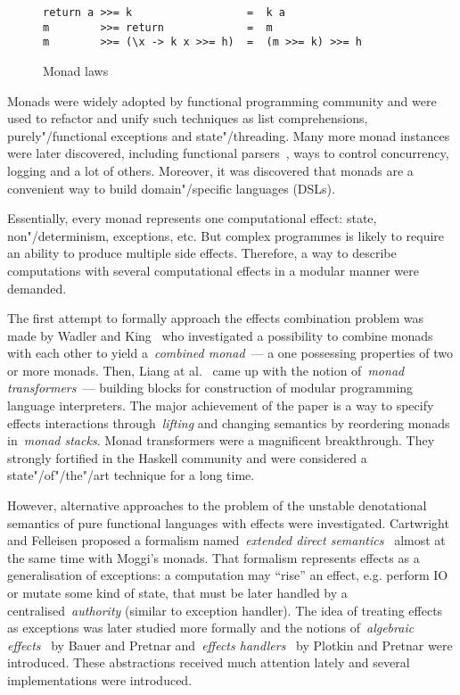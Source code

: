     \begin{figure}[h]
    \begin{lstlisting}
return a >>= k                  =  k a
m        >>= return             =  m
m        >>= (\x -> k x >>= h)  =  (m >>= k) >>= h
    \end{lstlisting}
    \caption{Monad laws}
    \label{listing:monadLaws}
    \end{figure}

Monads were widely adopted by functional programming community and were used to
refactor and unify such techniques as list comprehensions, purely"/functional
exceptions and state"/threading. Many more monad instances were later discovered,
including functional parsers~\cite{monParsing}, ways to control concurrency,
logging and a lot of others. Moreover, it was discovered that monads are a convenient
way to build domain"/specific languages (DSLs).

Essentially, every monad represents one computational effect: state,
non"/determinism, exceptions, etc. But complex programmes is likely to require an
ability to produce multiple side effects. Therefore, a way to describe
computations with several computational effects in a modular manner were demanded.

The first attempt to formally approach the effects combination problem was made
by Wadler and King~\cite{DBLP:conf/fp/KingW92} who investigated a possibility to
combine monads with each other to yield a~\emph{combined monad}~--- a one possessing
properties of two or more monads. Then, Liang at al.~\cite{Liang:1995:MTM:199448.199528}
came up with the notion of~\emph{monad transformers}~--- building blocks for construction
of modular programming language interpreters. The major achievement of the paper
is a way to specify effects interactions through~\emph{lifting} and changing
semantics by reordering monads in~\emph{monad stacks}. Monad transformers were a
magnificent breakthrough. They strongly fortified in the Haskell community and were
considered a state"/of"/the"/art technique for a long time.

However, alternative approaches to the problem of the unstable denotational semantics
of pure functional languages with effects were investigated. Cartwright and Felleisen proposed
a formalism named~\emph{extended direct semantics}~\cite{Cartwright1994} almost at the same
time with Moggi's monads. That formalism represents effects as a generalisation of exceptions:
a computation may ``rise'' an effect, e.g. perform IO or mutate some kind of state, that
must be later handled by a centralised~\emph{authority} (similar to exception handler).
The idea of treating effects as exceptions was later studied more formally and the
notions of~\emph{algebraic effects}~\cite{DBLP:journals/jlp/BauerP15} by Bauer and Pretnar
and~\emph{effects handlers}~\cite{Plotkin2009} by Plotkin and Pretnar were introduced. These
abstractions received much attention lately and several implementations were introduced.

